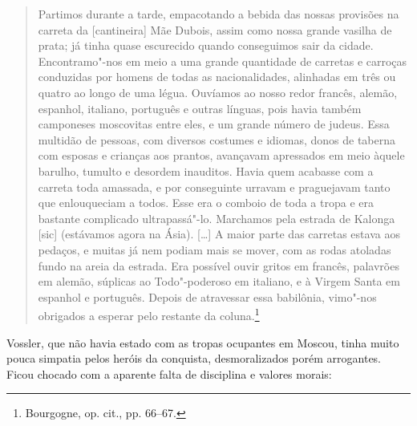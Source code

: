 \begin{quote}
Partimos durante a tarde, empacotando a bebida das nossas provisões na
carreta da {[}cantineira{]} Mãe Dubois, assim como nossa grande vasilha
de prata; já tinha quase escurecido quando conseguimos sair da cidade.
Encontramo"-nos em meio a uma grande quantidade de carretas e carroças
conduzidas por homens de todas as nacionalidades, alinhadas em três ou
quatro ao longo de uma légua. Ouvíamos ao nosso redor francês, alemão,
espanhol, italiano, português e outras línguas, pois havia também
camponeses moscovitas entre eles, e um grande número de judeus. Essa
multidão de pessoas, com diversos costumes e idiomas, donos de taberna
com esposas e crianças aos prantos, avançavam apressados em meio àquele
barulho, tumulto e desordem inauditos. Havia quem acabasse com a carreta
toda amassada, e por conseguinte urravam e praguejavam tanto que
enlouqueciam a todos. Esse era o comboio de toda a tropa e era bastante
complicado ultrapassá"-lo. Marchamos pela estrada de Kalonga {[}sic{]}
(estávamos agora na Ásia). [\ldots{}] A maior parte das carretas estava
aos pedaços, e muitas já nem podiam mais se mover, com as rodas atoladas
fundo na areia da estrada. Era possível ouvir gritos em francês,
palavrões em alemão, súplicas ao Todo"-poderoso em italiano, e à Virgem
Santa em espanhol e português. Depois de atravessar essa babilônia,
vimo"-nos obrigados a esperar pelo restante da coluna.\footnote{Bourgogne, op. cit., pp. 66--67.} 
\end{quote}

Vossler, que não havia estado com as tropas ocupantes em Moscou, tinha
muito pouca simpatia pelos heróis da conquista, desmoralizados porém
arrogantes. Ficou chocado com a aparente falta de disciplina e valores
morais:

